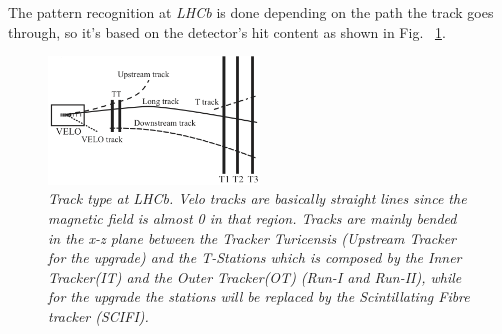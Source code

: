 \documentclass[paper=a4, fontsize=10pt]{scrartcl}
\numberwithin{equation}{section}		%
\numberwithin{figure}{section}			%
\numberwithin{table}{section}				%
\begin{document}
The pattern recognition at \textit{LHCb} is done depending on the path the track goes through, so it's based on the detector's hit content as shown in Fig. ~\ref{figure:Tracks}.
\begin{figure}[h]
  \begin{center}
    \includegraphics[width=0.5\textwidth]{Images/tracktype.png} 
  \caption[Caption for track type]{\emph{Track type at \textit{LHCb}. Velo tracks are basically straight lines since the magnetic field is almost 0 in that region. Tracks are mainly bended in the x-z \footnotemark plane between the Tracker Turicensis (Upstream Tracker for the upgrade) and the T-Stations which is composed by the Inner Tracker(IT) and the Outer Tracker(OT) (Run-I and Run-II), while for the upgrade the stations will be replaced by the Scintillating Fibre tracker (SCIFI).}}
  \label{figure:Tracks}
  \end{center}
\end{figure}
\end{document}
